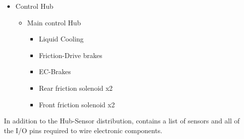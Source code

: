 \documentclass[main.tex]{subfiles}
\begin{document}
\begin{itemize}
\begin{itemize}
    \end{itemize}
    \item Control Hub
    \begin{itemize}
    	\item Main control Hub
    	\begin{itemize}
        	\item Liquid Cooling
            \item Friction-Drive brakes
            \item EC-Brakes
            \item Rear friction solenoid x2
            \item Front friction solenoid x2
        \end{itemize}
    \end{itemize}
\end{itemize}

In addition to the Hub-Sensor distribution,  contains a list of sensors and all of the I/O pins required to wire electronic components.
\end{document}
